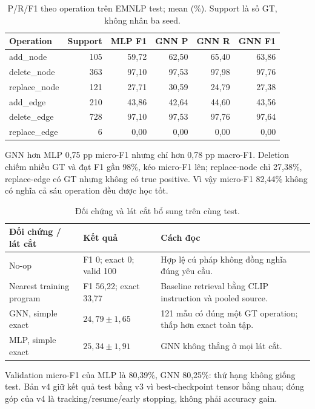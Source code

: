 \begin{table}[H]\centering\small
\caption{P/R/F1 theo operation trên EMNLP test; mean (\%). Support là số GT, không nhân ba seed.}\label{tab:operations}
\begin{tabular}{@{}lrrrrr@{}}\toprule
Operation & Support & MLP F1 & GNN P & GNN R & GNN F1\\\midrule
add\_node & 105 & 59,72 & 62,50 & 65,40 & 63,86\\
delete\_node & 363 & 97,10 & 97,53 & 97,98 & 97,76\\
replace\_node & 121 & 27,71 & 30,59 & 24,79 & 27,38\\
add\_edge & 210 & 43,86 & 42,64 & 44,60 & 43,56\\
delete\_edge & 728 & 97,10 & 97,53 & 97,76 & 97,64\\
replace\_edge & 6 & 0,00 & 0,00 & 0,00 & 0,00\\
\bottomrule\end{tabular}\end{table}

GNN hơn MLP 0,75 pp micro-F1 nhưng chỉ hơn 0,78 pp macro-F1.
Deletion chiếm nhiều GT và đạt F1 gần 98\%, kéo micro-F1 lên;
replace-node chỉ 27,38\%, replace-edge có GT nhưng không có true positive.
Vì vậy micro-F1 82,44\% không có nghĩa cả sáu operation đều được học tốt.

\begin{table}[H]\centering\small
\caption{Đối chứng và lát cắt bổ sung trên cùng test.}
\begin{tabularx}{\linewidth}{@{}p{49mm}p{35mm}X@{}}\toprule
Đối chứng / lát cắt & Kết quả & Cách đọc\\\midrule
No-op & F1 0; exact 0; valid 100 & Hợp lệ cú pháp không đồng nghĩa đúng yêu cầu.\\
Nearest training program & F1 56,22; exact 33,77 & Baseline retrieval bằng CLIP instruction và pooled source.\\
GNN, simple exact & $24,79\pm1,65$ & 121 mẫu có đúng một GT operation; thấp hơn exact toàn tập.\\
MLP, simple exact & $25,34\pm1,91$ & GNN không thắng ở mọi lát cắt.\\
\bottomrule\end{tabularx}\end{table}

Validation micro-F1 của MLP là 80,39\%, GNN 80,25\%: thứ hạng không giống test.
Bản v4 giữ kết quả test bằng v3 vì best-checkpoint tensor bằng nhau; đóng góp
của v4 là tracking/resume/early stopping, không phải accuracy gain.

